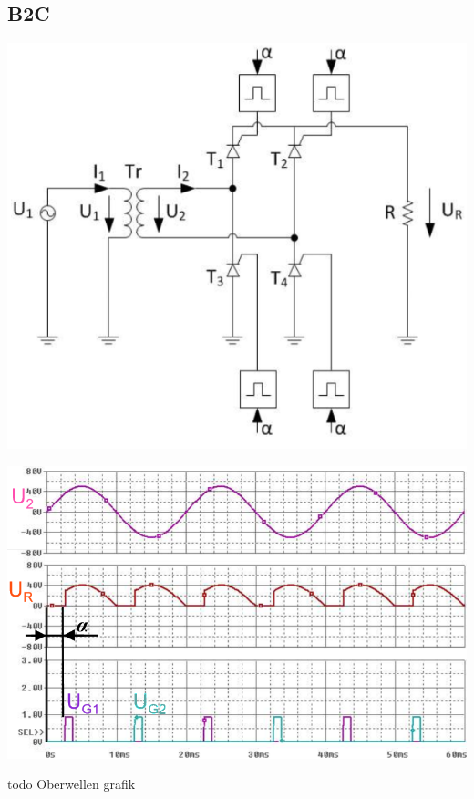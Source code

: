 \subsection{B2C}
\begin{minipage}{0.4\linewidth}
    \includegraphics[width=0.8\linewidth]{images/GRB2c}
\end{minipage}
\begin{minipage}{0.35\linewidth}
    \centering 
    \includegraphics[width=0.8\linewidth]{images/B2CKl}
    
\end{minipage}
\begin{minipage}{0.25\linewidth}
  todo Oberwellen grafik %
\end{minipage}
\newline
\vspace{-0.8cm}
